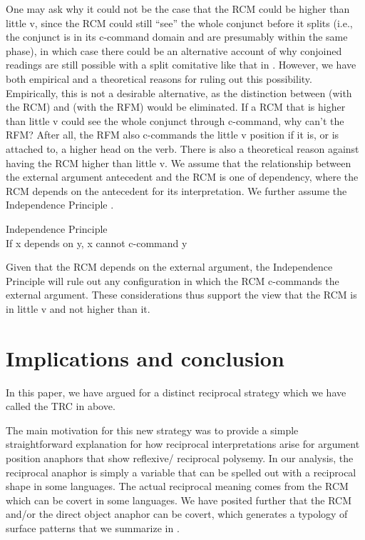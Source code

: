 \documentclass[output=paper]{langsci/langscibook}
\begin{document}
One may ask why it could not be the case that the RCM could be higher than little v, since the RCM could still “see” the whole conjunct before it splits (i.e., the conjunct is in its c-command domain and are presumably within the same phase), in which case there could be an alternative account of why conjoined readings are still possible with a split comitative like that in . However, we have both empirical and a theoretical reasons for ruling out this possibility. Empirically, this is not a desirable alternative, as the distinction between  (with the RCM) and  (with the RFM) would be eliminated. If a RCM that is higher than little v could see the whole conjunct through c-command, why can't the RFM? After all, the RFM also c-commands the little v position if it is, or is attached to, a higher head on the verb. There is also a theoretical reason against having the RCM higher than little v. We assume that the relationship between the external argument antecedent and the RCM is one of dependency, where the RCM depends on the antecedent for its interpretation. We further assume the Independence Principle \citep{Safir2004}. 


\ea\label{ex:safir:24}
Independence Principle \citep[3]{Safir2004}\\
  If x depends on y, x cannot c-command y
\z

Given that the RCM depends on the external argument, the Independence Principle will rule out any configuration in which the RCM c-commands the external argument. These considerations thus support the view that the RCM is in little v and not higher than it. 

\section{Implications and conclusion}\label{sec:safir:5}

In this paper, we have argued for a distinct reciprocal strategy which we have called the TRC in  above. 

The main motivation for this new strategy was to provide a simple straightforward explanation for how reciprocal interpretations arise for argument position anaphors that show reflexive/ reciprocal polysemy. In our analysis, the reciprocal anaphor is simply a variable that can be spelled out with a reciprocal shape in some languages. The actual reciprocal meaning comes from the RCM which can be covert in some languages. We have posited further that the RCM and/or the direct object anaphor can be covert, which generates a typology of surface patterns that we summarize in .
 
\end{document}
